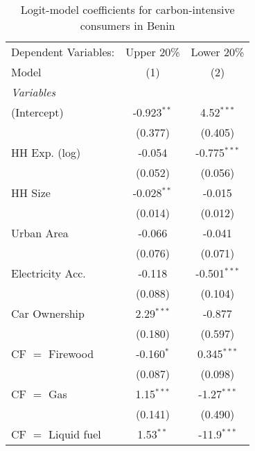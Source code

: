 
\begin{table}[htbp!]
   \centering
   \small
   \begin{adjustbox}{width = 1\textwidth, max height = 0.95\textheight, center}
      \begin{threeparttable}[b]
         \caption{\label{tab:Logit_1_BEN} Logit-model coefficients for carbon-intensive consumers in Benin}
         \begin{tabular}{lcc}
            \tabularnewline \midrule \midrule
            Dependent Variables: & Upper 20\%    & Lower 20\%\\   
            Model                & (1)           & (2)\\  
            \midrule
            \emph{Variables}\\
            (Intercept)          & -0.923$^{**}$ & 4.52$^{***}$\\   
                                 & (0.377)       & (0.405)\\   
            HH Exp. (log)        & -0.054        & -0.775$^{***}$\\   
                                 & (0.052)       & (0.056)\\   
            HH Size              & -0.028$^{**}$ & -0.015\\   
                                 & (0.014)       & (0.012)\\   
            Urban Area           & -0.066        & -0.041\\   
                                 & (0.076)       & (0.071)\\   
            Electricity Acc.     & -0.118        & -0.501$^{***}$\\   
                                 & (0.088)       & (0.104)\\   
            Car Ownership        & 2.29$^{***}$  & -0.877\\   
                                 & (0.180)       & (0.597)\\   
            CF $=$ Firewood      & -0.160$^{*}$  & 0.345$^{***}$\\   
                                 & (0.087)       & (0.098)\\   
            CF $=$ Gas           & 1.15$^{***}$  & -1.27$^{***}$\\   
                                 & (0.141)       & (0.490)\\   
            CF $=$ Liquid fuel   & 1.53$^{**}$   & -11.9$^{***}$\\   

\end{tabular}
\end{threeparttable}
\end{adjustbox}
\end{table}

